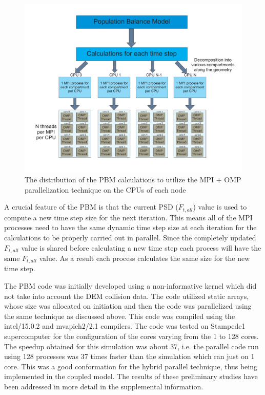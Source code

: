 \documentclass[preprint,11pt,authoryear]{elsarticle}
\begin{document}
\begin{figure}[H]
\centering
\includegraphics[scale=0.5]{PBM_decomposition.pdf}
\caption{The distribution of the PBM calculations to utilize the MPI + OMP parallelization technique on the CPUs of each node}
\label{fig:mthds_PBM_decompostion}
\end{figure}

A crucial feature of the PBM is that the current PSD ($F_{t,all}$) value is used to compute a new 
time step size for the next iteration. This means all of the MPI processes need to have the same 
dynamic time step size at each iteration for the calculations to be properly carried out in parallel. Since 
the completely updated $F_{t,all}$ value is shared before calculating a new time step each process will 
have the same $F_{t,all}$ value. As a result each process calculates the same size for the new time 
step. 

The PBM code was initially developed using a non-informative kernel which did not take into account the DEM collision data.
The code utilized static arrays, whose size was allocated on initiation and then the code was parallelized using the same
technique as discussed above. This code was compiled using the intel/15.0.2 and mvapich2/2.1 compilers. The code was tested on
Stampede1 supercomputer for the configuration of the cores varying from the 1 to 128 cores. The speedup obtained for this simulation 
was about 37, i.e. the parallel code run using 128 processes was 37 times faster than the simulation which ran just on 1 core.
This was a good conformation for the hybrid parallel technique, thus being implemented in the coupled model. The results of these 
preliminary studies have been addressed in more detail in the supplemental information.
\end{document}
